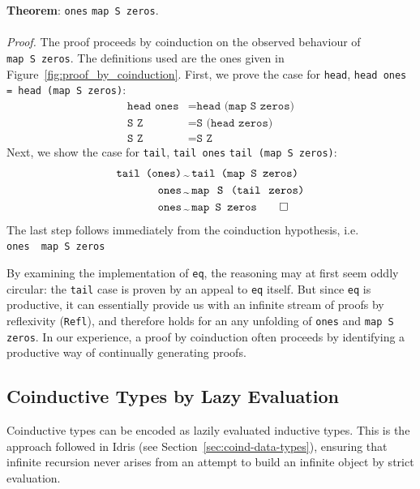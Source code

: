 \begin{framed}
\textbf{Theorem}: \texttt{ones} \bisim{} \texttt{map S zeros}. \\\\
\emph{Proof.} The proof proceeds by coinduction on the observed behaviour of \texttt{map~S~zeros}. The definitions used are the
ones given in Figure~\ref{fig:proof_by_coinduction}. First, we prove the case
for \texttt{head}, \texttt{head ones = head~(map~S~zeros)}:
\begin{align*}
   \texttt{head ones} &= \texttt{head (map S zeros)} \\
   \texttt{S Z} &= \texttt{S (head zeros)} \\
   \texttt{S Z} &= \texttt{S Z}
\end{align*}
Next, we show the case for \texttt{tail}, \texttt{tail ones} \bisim{} \texttt{tail
  (map S zeros)}:
\begin{align*}
   \texttt{tail (ones)}\, &\bisim\, \texttt{tail (map S zeros)} \\
   \texttt{ones}\,&\bisim\, \texttt{map\, S\, (tail\, zeros)} \\
   \texttt{ones} \,&\bisim\, \texttt{map S zeros} \qed
\end{align*}
The last step follows immediately from the coinduction hypothesis, i.e. {\texttt{ones}~\bisim{}~\texttt{map~S~zeros}}
\end{framed}



By examining the implementation of \texttt{eq}, the reasoning may at first seem
oddly circular: the \texttt{tail} case is proven by an appeal to \texttt{eq}
itself. But since \texttt{eq} is productive, it can essentially provide us with
an infinite stream of proofs by reflexivity (\texttt{Refl}), and therefore holds
for an any unfolding of \texttt{ones} and \texttt{map S zeros}. In
our experience, a proof by coinduction often proceeds by identifying a productive
way of continually generating proofs.

\subsection{Coinductive Types by Lazy Evaluation}
Coinductive types can be encoded as lazily evaluated inductive types. This is
the approach followed in Idris (see Section~\ref{sec:coind-data-types}),
ensuring that infinite recursion never arises from an attempt to build an
infinite object by strict evaluation. 

